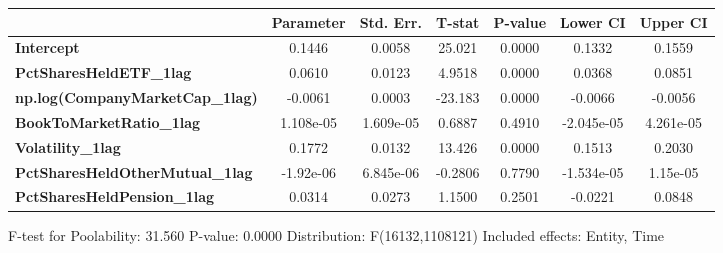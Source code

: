 \begin{center}
\begin{tabular}{lclc}
\bottomrule
\end{tabular}
\begin{tabular}{lcccccc}
                                        & \textbf{Parameter} & \textbf{Std. Err.} & \textbf{T-stat} & \textbf{P-value} & \textbf{Lower CI} & \textbf{Upper CI}  \\
\midrule
\textbf{Intercept}                      &       0.1446       &       0.0058       &      25.021     &      0.0000      &       0.1332      &       0.1559       \\
\textbf{PctSharesHeldETF\_1lag}         &       0.0610       &       0.0123       &      4.9518     &      0.0000      &       0.0368      &       0.0851       \\
\textbf{np.log(CompanyMarketCap\_1lag)} &      -0.0061       &       0.0003       &     -23.183     &      0.0000      &      -0.0066      &      -0.0056       \\
\textbf{BookToMarketRatio\_1lag}        &     1.108e-05      &     1.609e-05      &      0.6887     &      0.4910      &     -2.045e-05    &     4.261e-05      \\
\textbf{Volatility\_1lag}               &       0.1772       &       0.0132       &      13.426     &      0.0000      &       0.1513      &       0.2030       \\
\textbf{PctSharesHeldOtherMutual\_1lag} &     -1.92e-06      &     6.845e-06      &     -0.2806     &      0.7790      &     -1.534e-05    &      1.15e-05      \\
\textbf{PctSharesHeldPension\_1lag}     &       0.0314       &       0.0273       &      1.1500     &      0.2501      &      -0.0221      &       0.0848       \\
\bottomrule
\end{tabular}
\end{center}

F-test for Poolability: 31.560 \newline
 P-value: 0.0000 \newline
 Distribution: F(16132,1108121) \newline
  \newline
 Included effects: Entity, Time